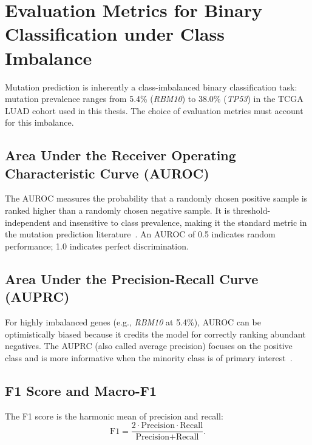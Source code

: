 \section{Evaluation Metrics for Binary Classification under Class Imbalance}
\label{sec:bg:metrics}

Mutation prediction is inherently a class-imbalanced binary classification
task: mutation prevalence ranges from 5.4\% (\textit{RBM10}) to 38.0\%
(\textit{TP53}) in the TCGA LUAD cohort used in this thesis.
The choice of evaluation metrics must account for this imbalance.

\subsection{Area Under the Receiver Operating Characteristic Curve (AUROC)}
\label{sec:bg:auroc}

The AUROC measures the probability that a randomly chosen positive sample is ranked higher than a randomly chosen negative sample.
It is threshold-independent and insensitive to class prevalence, making it the standard metric in the mutation prediction literature~\cite{coudray2018classification,kather2020pancancer,zhao2025deepgem}.
An AUROC of 0.5 indicates random performance; 1.0 indicates perfect discrimination.

\subsection{Area Under the Precision-Recall Curve (AUPRC)}
\label{sec:bg:auprc}

For highly imbalanced genes (e.g., \textit{RBM10} at 5.4\%), AUROC can be optimistically biased because it credits the model for correctly ranking abundant negatives.
The AUPRC (also called average precision) focuses on the positive class and is more informative when the minority class is of primary interest~\cite{davis2006auprc}.

\subsection{F1 Score and Macro-F1}
\label{sec:bg:f1}

The F1 score is the harmonic mean of precision and recall:
\begin{equation}
\label{eq:f1}
\text{F1} = \frac{2 \cdot \text{Precision} \cdot \text{Recall}}{\text{Precision} + \text{Recall}}.
\end{equation}

